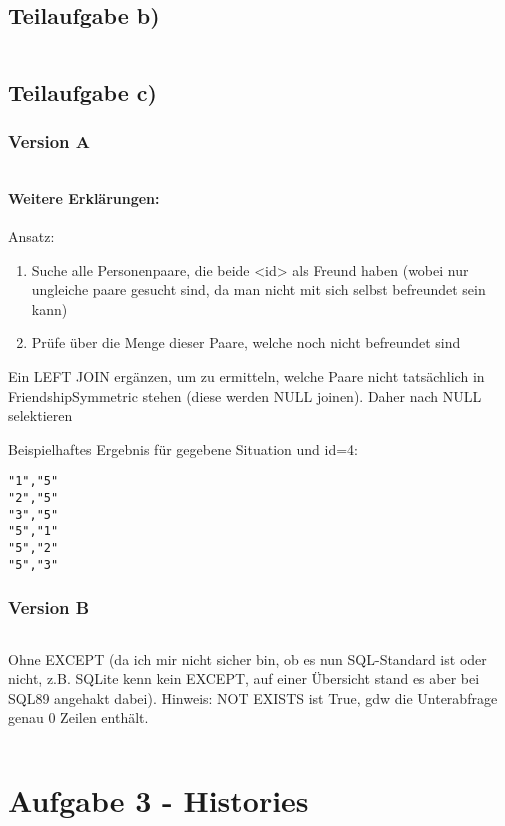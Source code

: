 \documentclass[a4paper,9pt]{scrartcl}
\begin{document}
\subsection{Teilaufgabe b)}
\inputminted[linenos, numbersep=5pt, tabsize=4]{sql}{d2b.sql}

\subsection{Teilaufgabe c)}
\subsubsection{Version A}
\inputminted[linenos, numbersep=5pt, tabsize=4]{sql}{d2c1.sql}

\paragraph{Weitere Erklärungen:}
Ansatz:
\begin{enumerate}
    \item Suche alle Personenpaare, die beide <id> als Freund haben (wobei
   nur ungleiche paare gesucht sind, da man nicht mit sich selbst befreundet
   sein kann)
    \item Prüfe über die Menge dieser Paare, welche noch nicht befreundet sind
\end{enumerate}

Ein LEFT JOIN ergänzen, um zu ermitteln, welche Paare nicht tatsächlich
in FriendshipSymmetric stehen (diese werden NULL joinen). Daher nach NULL
selektieren


Beispielhaftes Ergebnis für gegebene Situation und id=4:
\begin{verbatim}
"1","5"
"2","5"
"3","5"
"5","1"
"5","2"
"5","3"
\end{verbatim}

\subsubsection{Version B}
\inputminted[linenos, numbersep=5pt, tabsize=4]{sql}{d2c2.sql}

Ohne EXCEPT (da ich mir nicht sicher bin, ob es nun SQL-Standard
ist oder nicht, z.B. SQLite kenn kein EXCEPT, auf einer Übersicht
stand es aber bei SQL89 angehakt dabei).
Hinweis: NOT EXISTS ist True, gdw die Unterabfrage genau 0
Zeilen enthält.

\inputminted[linenos, numbersep=5pt, tabsize=4]{sql}{d2c2.1.sql}

\section{Aufgabe 3 - Histories}
\end{document}
